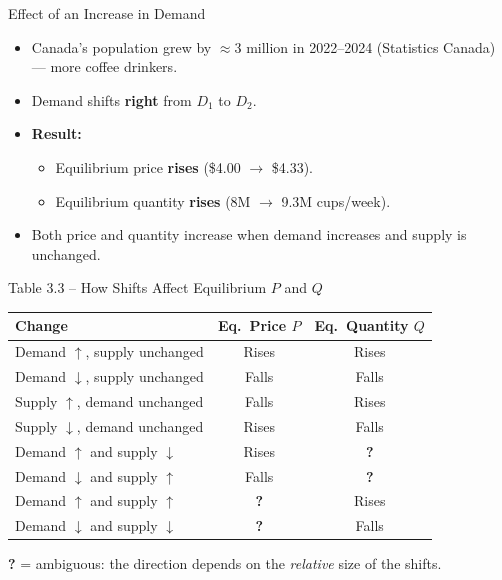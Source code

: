 \documentclass[aspectratio=169]{beamer}
\begin{document}
\begin{frame}{Effect of an Increase in Demand}
\transfade
\begin{itemize}
  \item Canada's population grew by $\approx$3 million in 2022--2024 (Statistics Canada) --- more coffee drinkers.
  \item Demand shifts \textbf{right} from $D_1$ to $D_2$.
  \item \textbf{Result:}
  \begin{itemize}
    \item Equilibrium price \textbf{rises} (\$4.00 $\to$ \$4.33).
    \item Equilibrium quantity \textbf{rises} (8M $\to$ 9.3M cups/week).
  \end{itemize}
  \item Both price and quantity increase when demand increases and supply is unchanged.
\end{itemize}
\end{frame}

\begin{frame}{Table 3.3 -- How Shifts Affect Equilibrium $P$ and $Q$}
\begin{center}
\renewcommand{\arraystretch}{1.5}
\begin{tabular}{lcc}
\toprule
\textbf{Change} & \textbf{Eq.\ Price $P$} & \textbf{Eq.\ Quantity $Q$} \\
\midrule
Demand $\uparrow$, supply unchanged & \textcolor{leafgreen}{Rises} & \textcolor{leafgreen}{Rises} \\
Demand $\downarrow$, supply unchanged & \textcolor{canadared}{Falls} & \textcolor{canadared}{Falls} \\
Supply $\uparrow$, demand unchanged & \textcolor{canadared}{Falls} & \textcolor{leafgreen}{Rises} \\
Supply $\downarrow$, demand unchanged & \textcolor{leafgreen}{Rises} & \textcolor{canadared}{Falls} \\
\midrule
Demand $\uparrow$ and supply $\downarrow$ & \textcolor{leafgreen}{Rises} & \textbf{?} \\
Demand $\downarrow$ and supply $\uparrow$ & \textcolor{canadared}{Falls} & \textbf{?} \\
Demand $\uparrow$ and supply $\uparrow$ & \textbf{?} & \textcolor{leafgreen}{Rises} \\
Demand $\downarrow$ and supply $\downarrow$ & \textbf{?} & \textcolor{canadared}{Falls} \\
\bottomrule
\end{tabular}
\end{center}
\vspace{0.3em}
{\small \textbf{?} = ambiguous: the direction depends on the \emph{relative} size of the shifts.}
\end{frame}
\end{document}
